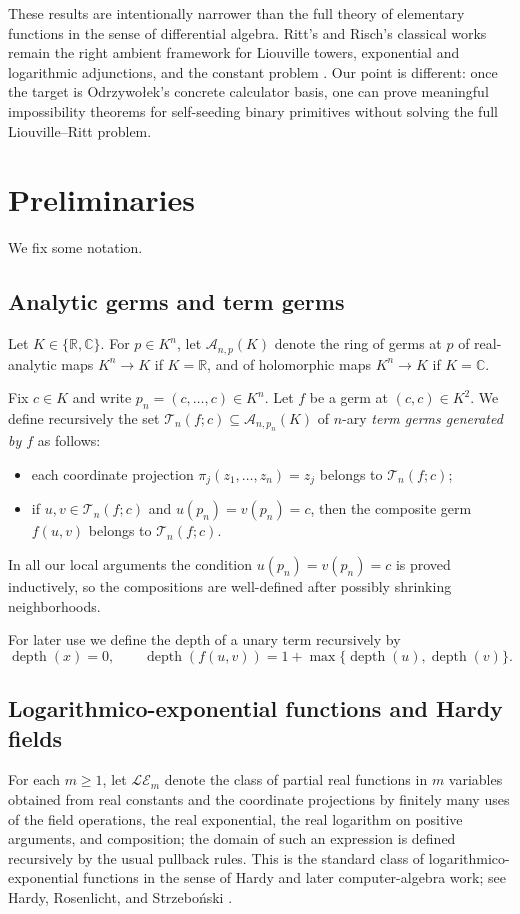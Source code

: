 \documentclass[12pt]{amsart}
\theoremstyle{remark}
\newcommand{\C}{\mathbb{C}}
\newcommand{\R}{\mathbb{R}}
\newcommand{\LE}{\mathcal{LE}}
\newcommand{\Term}{\mathcal{T}}
\begin{document}
These results are intentionally narrower than the full theory of elementary functions in the sense of differential algebra.  Ritt's and Risch's classical works remain the right ambient framework for Liouville towers, exponential and logarithmic adjunctions, and the constant problem \cite{Ritt1948,Risch1969}.  Our point is different: once the target is Odrzywo\l{}ek's concrete calculator basis, one can prove meaningful impossibility theorems for self-seeding binary primitives without solving the full Liouville--Ritt problem.

\section{Preliminaries}

We fix some notation.

\subsection*{Analytic germs and term germs}
Let $K\in\{\R,\C\}$.  For $p\in K^n$, let $\mathcal{A}_{n,p}(K)$ denote the ring of germs at $p$ of real-analytic maps $K^n\to K$ if $K=\R$, and of holomorphic maps $K^n\to K$ if $K=\C$.

Fix $c\in K$ and write $p_n=(c,\dots,c)\in K^n$.  Let $f$ be a germ at $(c,c)\in K^2$.  We define recursively the set $\Term_n(f;c)\subseteq \mathcal{A}_{n,p_n}(K)$ of $n$-ary \emph{term germs generated by $f$} as follows:
\begin{itemize}
    \item each coordinate projection $\pi_j(z_1,\dots,z_n)=z_j$ belongs to $\Term_n(f;c)$;
    \item if $u,v\in \Term_n(f;c)$ and $u(p_n)=v(p_n)=c$, then the composite germ $f(u,v)$ belongs to $\Term_n(f;c)$.
\end{itemize}
In all our local arguments the condition $u(p_n)=v(p_n)=c$ is proved inductively, so the compositions are well-defined after possibly shrinking neighborhoods.

For later use we define the depth of a unary term recursively by
\[
\operatorname{depth}(x)=0,
\qquad
\operatorname{depth}(f(u,v))=1+\max\{\operatorname{depth}(u),\operatorname{depth}(v)\}.
\]

\subsection*{Logarithmico-exponential functions and Hardy fields}
For each $m\geq 1$, let $\LE_m$ denote the class of partial real functions in $m$ variables obtained from real constants and the coordinate projections by finitely many uses of the field operations, the real exponential, the real logarithm on positive arguments, and composition; the domain of such an expression is defined recursively by the usual pullback rules.  This is the standard class of logarithmico-exponential functions in the sense of Hardy and later computer-algebra work; see Hardy, Rosenlicht, and Strzebo\'nski \cite{Hardy1910,Rosenlicht1983,Strzebonski2019}.
\end{document}
